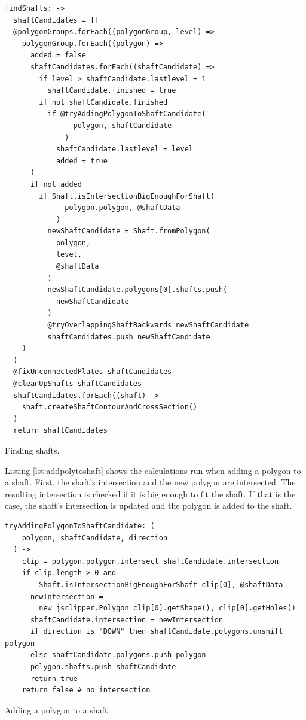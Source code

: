 \documentclass[../ClassicThesis.tex]{subfiles}
\begin{document}
\begin{listing}
\begin{verbatim}
findShafts: ->
  shaftCandidates = []
  @polygonGroups.forEach((polygonGroup, level) =>
    polygonGroup.forEach((polygon) =>
      added = false
      shaftCandidates.forEach((shaftCandidate) =>
        if level > shaftCandidate.lastlevel + 1
          shaftCandidate.finished = true
        if not shaftCandidate.finished
          if @tryAddingPolygonToShaftCandidate(
                polygon, shaftCandidate
              )
            shaftCandidate.lastlevel = level
            added = true
      )
      if not added
        if Shaft.isIntersectionBigEnoughForShaft(
              polygon.polygon, @shaftData
            )
          newShaftCandidate = Shaft.fromPolygon(
            polygon,
            level,
            @shaftData
          )
          newShaftCandidate.polygons[0].shafts.push(
            newShaftCandidate
          )
          @tryOverlappingShaftBackwards newShaftCandidate
          shaftCandidates.push newShaftCandidate
    )
  )
  @fixUnconnectedPlates shaftCandidates
  @cleanUpShafts shaftCandidates
  shaftCandidates.forEach((shaft) ->
    shaft.createShaftContourAndCrossSection()
  )
  return shaftCandidates
\end{verbatim}
\caption{Finding shafts.}
\label{lst:findshafts}
\end{listing}

Listing \ref{lst:addpolytoshaft} shows the calculations run when adding a polygon to a shaft. First, the shaft's intersection and the new polygon are intersected. The resulting intersection is checked if it is big enough to fit the shaft. If that is the case, the shaft's intersection is updated and the polygon is added to the shaft.

\begin{listing}
\begin{verbatim}
tryAddingPolygonToShaftCandidate: (
    polygon, shaftCandidate, direction
  ) ->
    clip = polygon.polygon.intersect shaftCandidate.intersection
    if clip.length > 0 and
        Shaft.isIntersectionBigEnoughForShaft clip[0], @shaftData
      newIntersection =
        new jsclipper.Polygon clip[0].getShape(), clip[0].getHoles()
      shaftCandidate.intersection = newIntersection
      if direction is "DOWN" then shaftCandidate.polygons.unshift polygon
      else shaftCandidate.polygons.push polygon
      polygon.shafts.push shaftCandidate
      return true
    return false # no intersection
\end{verbatim}
\caption{Adding a polygon to a shaft.}
\label{lst:addpolytoshaft}
\end{listing}
\end{document}
